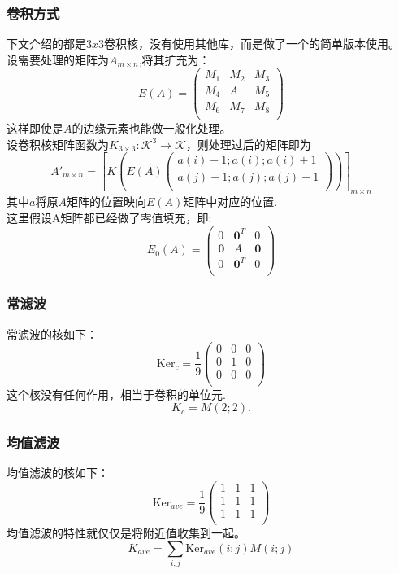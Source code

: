 \documentclass[UTF8]{ctexart}
\newcommand{\brm}[1]{\left[{{}#1}\right]}
\begin{document}
\subsubsection{卷积方式}
\indent 下文介绍的都是$3x3$卷积核，没有使用其他库，而是做了一个的简单版本使用。\\
\indent 设需要处理的矩阵为$A_{m\times n}$,将其扩充为：
$$
    E(A) = \begin{pmatrix}
        M_1 & M_2 & M_3\\
        M_4 & A & M_5\\
        M_6 & M_7 & M_8\\
    \end{pmatrix}
$$
这样即使是$A$的边缘元素也能做一般化处理。\\
\indent 设卷积核矩阵函数为$K_{3\times 3}: \mathcal{K}^3 \to \mathcal{K}$，则处理过后的矩阵即为
$$
    A'_{m\times n} = \brm{K(E(A)\begin{pmatrix}
        a(i)-1;a(i);a(i)+1\\
        a(j)-1;a(j);a(j)+1\\
    \end{pmatrix})}_{m\times n}
$$
\indent 其中$a$将原$A$矩阵的位置映向$E(A)$矩阵中对应的位置.\\
这里假设A矩阵都已经做了零值填充，即:
$$
    E_0(A) = \begin{pmatrix}
        0 & \mathbf{0}^{T} & 0\\
        \mathbf{0} & A & \mathbf{0}\\
        0 & \mathbf{0}^T & 0\\
    \end{pmatrix}
$$
\subsubsection{常滤波}
常滤波的核如下：
$$
    \mathrm{Ker}_{c} = \frac{1}{9}\begin{pmatrix}
        0 & 0 & 0\\
        0 & 1 & 0\\
        0 & 0 & 0\\
    \end{pmatrix}
$$
这个核没有任何作用，相当于卷积的单位元.
$$
    K_{c} = M(2;2).
$$
\subsubsection{均值滤波}
均值滤波的核如下：
$$
    \mathrm{Ker}_{ave} = \frac{1}{9}\begin{pmatrix}
        1 & 1 & 1\\
        1 & 1 & 1\\
        1 & 1 & 1\\
    \end{pmatrix}
$$
均值滤波的特性就仅仅是将附近值收集到一起。
$$
    K_{ave} = \sum_{i,j} \mathrm{Ker}_{ave}(i;j)M(i;j)
$$
\end{document}
